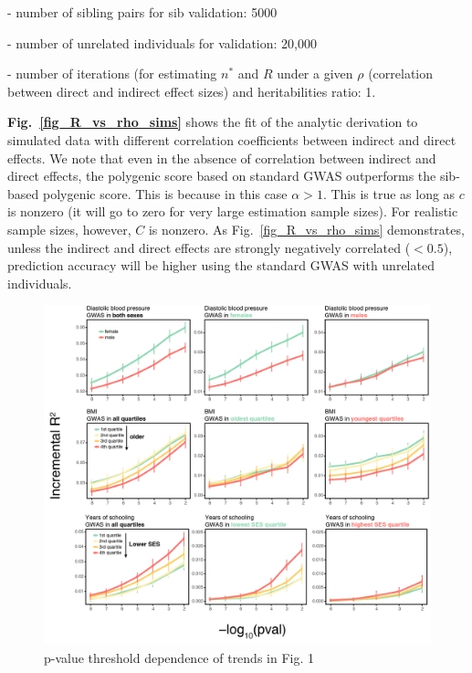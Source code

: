 \documentclass[hidelinks, 12pt]{article}
\begin{document}
- number of sibling pairs for sib validation: 5000 

- number of unrelated individuals for validation: 20,000

- number of iterations (for estimating $n^*$ and $R$ under a given $\rho$ (correlation between direct and indirect effect sizes) and heritabilities ratio: 1.

\vspace{0.5cm}
{\bf Fig.~\ref{fig_R_vs_rho_sims}} shows the fit of the analytic derivation to simulated data with different correlation coefficients between indirect and direct effects.  We note that even in the absence of correlation between indirect and direct effects, the polygenic score based on standard GWAS outperforms the sib-based polygenic score.  This is because in this case $\alpha > 1$.  This is true as long as $c$ is nonzero (it will go to zero for very large estimation sample sizes). For realistic sample sizes, however, $C$ is nonzero.  As Fig.~\ref{fig_R_vs_rho_sims} demonstrates, unless the indirect and direct effects are strongly negatively correlated ($<0.5$), prediction accuracy will be higher using the standard GWAS with unrelated individuals.


\begin{figure}[h!]
\includegraphics[width=\textwidth]{./supp_figures/fig1_Rsweep.png}
\caption{p-value threshold dependence of trends in Fig. 1}
\centering
\end{figure}
\end{document}

